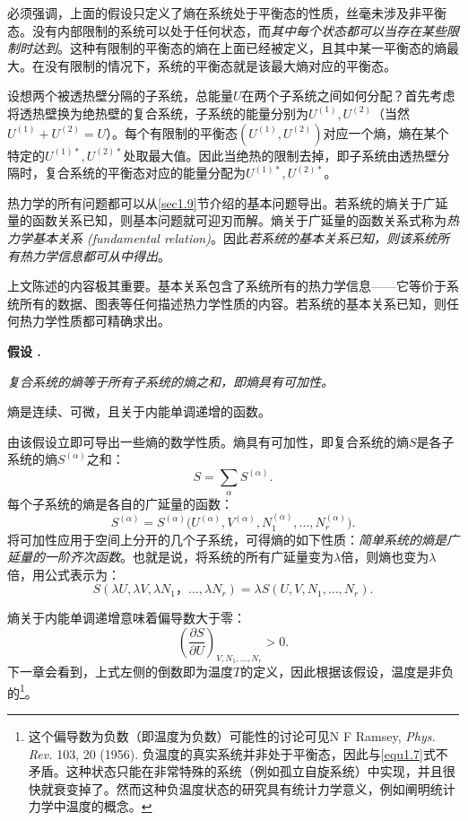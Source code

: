 必须强调，上面的假设只定义了熵在系统处于平衡态的性质，丝毫未涉及非平衡态。没有内部限制的系统可以处于任何状态，而{\it 其中每个状态都可以当存在某些限制时达到}。这种有限制的平衡态的熵在上面已经被定义，且其中某一平衡态的熵最大。在没有限制的情况下，系统的平衡态就是该最大熵对应的平衡态。

设想两个被透热壁分隔的子系统，总能量$U$在两个子系统之间如何分配？首先考虑将透热壁换为绝热壁的复合系统，子系统的能量分别为$U^{(1)}, U^{(2)}$（当然$U^{(1)} + U^{(2)} = U$）。每个有限制的平衡态$(U^{(1)}, U^{(2)})$对应一个熵，熵在某个特定的$U^{(1)*}, U^{(2)*}$处取最大值。因此当绝热的限制去掉，即子系统由透热壁分隔时，复合系统的平衡态对应的能量分配为$U^{(1)*}, U^{(2)*}$。

热力学的所有问题都可以从\ref{sec1.9}节介绍的基本问题导出。若系统的熵关于广延量的函数关系已知，则基本问题就可迎刃而解。熵关于广延量的函数关系式称为{\it 热力学基本关系 (fundamental relation)}。因此{\it 若系统的基本关系已知，则该系统所有热力学信息都可从中得出}。

上文陈述的内容极其重要。基本关系包含了系统所有的热力学信息——它等价于系统所有的数据、图表等任何描述热力学性质的内容。若系统的基本关系已知，则任何热力学性质都可精确求出。


{\bf 假设 \uppercase\expandafter{}. } {\it 
复合系统的熵等于所有子系统的熵之和，即熵具有可加性。

熵是连续、可微，且关于内能单调递增的函数。}

由该假设立即可导出一些熵的数学性质。熵具有可加性，即复合系统的熵$S$是各子系统的熵$S^{(\alpha)}$之和：
\begin{equation}
\label{equ1.4}
	S = \sum_\alpha S^{(\alpha)}.
\end{equation}
每个子系统的熵是各自的广延量的函数：
\begin{equation}
\label{equ1.5}
	S^{(\alpha)} = S^{(\alpha)} \Big( U^{(\alpha)}, V^{(\alpha)}, N_1^{(\alpha)}, \dots, N_r^{(\alpha)} \Big).
\end{equation}
将可加性应用于空间上分开的几个子系统，可得熵的如下性质：{\it 简单系统的熵是广延量的一阶齐次函数}。也就是说，将系统的所有广延量变为$\lambda$倍，则熵也变为$\lambda$倍，用公式表示为：
\begin{equation}
\label{equ1.6}
	S(\lambda U, \lambda V, \lambda N_1， \dots, \lambda N_r) = \lambda S(U, V, N_1, \dots, N_r).
\end{equation}

熵关于内能单调递增意味着偏导数大于零：
\begin{equation}
\label{equ1.7}
	\left( \frac{\partial S}{\partial U} \right)_{V, N_1, \dots, N_r} > 0.
\end{equation}
下一章会看到，上式左侧的倒数即为温度$T$的定义，因此根据该假设，温度是非负的\footnote{这个偏导数为负数（即温度为负数）可能性的讨论可见N F Ramsey, {\it Phys. Rev.} 103, 20 (1956). 负温度的真实系统并非处于平衡态，因此与\eqref{equ1.7}式不矛盾。这种状态只能在非常特殊的系统（例如孤立自旋系统）中实现，并且很快就衰变掉了。然而这种负温度状态的研究具有统计力学意义，例如阐明统计力学中温度的概念。 }。

